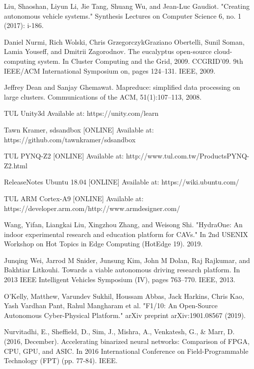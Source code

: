 \documentclass[conference]{IEEEtran}
\begin{document}
\begin{sloppypar}
\begin{thebibliography}{00}

 Liu, Shaoshan, Liyun Li, Jie Tang, Shuang Wu, and Jean-Luc Gaudiot. "Creating autonomous vehicle systems." Synthesis Lectures on Computer Science 6, no. 1 (2017): i-186.

 Daniel Nurmi, Rich Wolski, Chris GrzegorczykGraziano Obertelli, Sunil Soman, Lamia Youseff, and Dmitrii Zagorodnov. The eucalyptus open-source cloud-computing system. In Cluster Computing and the Grid, 2009. CCGRID’09. 9th IEEE/ACM International Symposium on, pages 124–131. IEEE, 2009.

 Jeffrey Dean and Sanjay Ghemawat. Mapreduce: simplified data processing on large clusters. Communications
of the ACM, 51(1):107–113, 2008.

 TUL Unity3d Available at: https://unity.com/learn

 Tawn Kramer, sdsandbox [ONLINE] Available at: https://github.com/tawnkramer/sdsandbox

 TUL PYNQ-Z2 [ONLINE] Available at: http://www.tul.com.tw/ProductsPYNQ-Z2.html

 ReleaseNotes Ubuntu 18.04 [ONLINE] Available at: https://wiki.ubuntu.com/

 TUL ARM Cortex-A9 [ONLINE] Available at: https://developer.arm.com/http://www.armdesigner.com/

 Wang, Yifan, Liangkai Liu, Xingzhou Zhang, and Weisong Shi. "HydraOne: An indoor experimental research and education platform for CAVs." In 2nd {USENIX} Workshop on Hot Topics in Edge Computing (HotEdge 19). 2019.

 Junqing Wei, Jarrod M Snider, Junsung Kim, John M Dolan, Raj Rajkumar, and Bakhtiar Litkouhi. Towards a viable autonomous driving research platform. In 2013 IEEE Intelligent Vehicles Symposium (IV), pages 763–770. IEEE, 2013.

 O'Kelly, Matthew, Varundev Sukhil, Houssam Abbas, Jack Harkins, Chris Kao, Yash Vardhan Pant, Rahul Mangharam et al. "F1/10: An Open-Source Autonomous Cyber-Physical Platform." arXiv preprint arXiv:1901.08567 (2019).

 Nurvitadhi, E., Sheffield, D., Sim, J., Mishra, A., Venkatesh, G., \& Marr, D. (2016, December). Accelerating binarized neural networks: Comparison of FPGA, CPU, GPU, and ASIC. In 2016 International Conference on Field-Programmable Technology (FPT) (pp. 77-84). IEEE.


\end{thebibliography}
\end{sloppypar}
\end{document}
